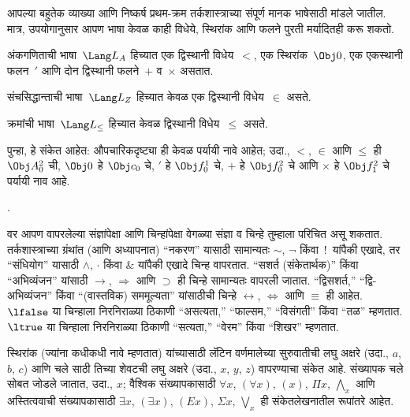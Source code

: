 आपल्या बहुतेक व्याख्या आणि निष्कर्ष प्रथम-क्रम तर्कशास्त्राच्या संपूर्ण
मानक भाषेसाठी मांडले जातील. मात्र, उपयोगानुसार आपण भाषा केवळ काही
विधेये, स्थिरांक आणि फलने पुरती मर्यादितही करू शकतो.

\begin{ex}
अंकगणिताची भाषा~$\Lang L_A$ हिच्यात एक द्विस्थानी विधेय~$<$,
एक स्थिरांक~$\Obj 0$, एक एकस्थानी फलन~$\prime$ आणि दोन
द्विस्थानी फलने~$+$ व~$\times$ असतात.
\end{ex}

\begin{ex}
संचसिद्धान्ताची भाषा~$\Lang L_Z$ हिच्यात केवळ एक द्विस्थानी
विधेय~$\in$ असते.
\end{ex}

\begin{ex}
क्रमांची भाषा~$\Lang L_\le$ हिच्यात केवळ द्विस्थानी
विधेय~$\le$ असते.
\end{ex}

पुन्हा, हे संकेत आहेत: औपचारिकदृष्ट्या ही केवळ पर्यायी नावे आहेत;
उदा., $<$, $\in$ आणि $\le$ ही $\Obj A^2_0$ ची, $\Obj 0$ हे
$\Obj c_0$ चे, $\prime$ हे $\Obj f^1_0$ चे, $+$ हे $\Obj f^2_0$ चे आणि $\times$ हे
$\Obj f^2_1$ चे पर्यायी नाव आहे.

.





\begin{intro}
वर आपण वापरलेल्या संज्ञांपेक्षा आणि चिन्हांपेक्षा वेगळ्या संज्ञा व
चिन्हे तुम्हाला परिचित असू शकतात. तर्कशास्त्राच्या ग्रंथांत (आणि
अध्यापनात) ``नकरण'' यासाठी सामान्यतः $\sim$, $\neg$ किंवा~!\ यांपैकी
एखादे, तर ``संधियोग'' यासाठी $\wedge$, $\cdot$ किंवा $\&$ यांपैकी
एखादे चिन्ह वापरतात. ``सशर्त (संकेतार्थक)'' किंवा ``अभिव्यंजन'' यांसाठी
$\rightarrow$, $\Rightarrow$ आणि $\supset$ ही चिन्हे सामान्यतः वापरली जातात.
``द्विसशर्त,'' ``द्वि-अभिव्यंजन'' किंवा
  ``(वास्तविक) सममूल्यता'' यांसाठीची चिन्हे $\leftrightarrow$,
  $\Leftrightarrow$ आणि $\equiv$ ही आहेत.
$\lfalse$ या चिन्हाला निरनिराळ्या ठिकाणी
  ``असत्यता,'' ``फाल्सम,'' ``विसंगती'' किंवा ``तळ'' म्हणतात.
$\ltrue$ या चिन्हाला निरनिराळ्या ठिकाणी
  ``सत्यता,'' ``वेरम'' किंवा ``शिखर'' म्हणतात.

स्थिरांक (ज्यांना कधीकधी नावे म्हणतात) यांच्यासाठी लॅटिन
वर्णमालेच्या सुरुवातीची लघु अक्षरे (उदा., $a$, $b$, $c$) आणि
चले साठी तिच्या शेवटची लघु अक्षरे (उदा., $x$, $y$, $z$)
वापरण्याचा संकेत आहे. संख्यापक चले सोबत जोडले जातात, उदा.,
$x$; वैश्विक संख्यापकासाठी $\forall x$, $(\forall x)$, $(x)$, $\Pi x$,
$\bigwedge_x$ आणि अस्तित्ववाची संख्यापकासाठी $\exists x$, $(\exists
x)$, $(Ex)$, $\Sigma x$, $\bigvee_x$ ही संकेतलेखनातील रूपांतरे आहेत.
\end{intro}

